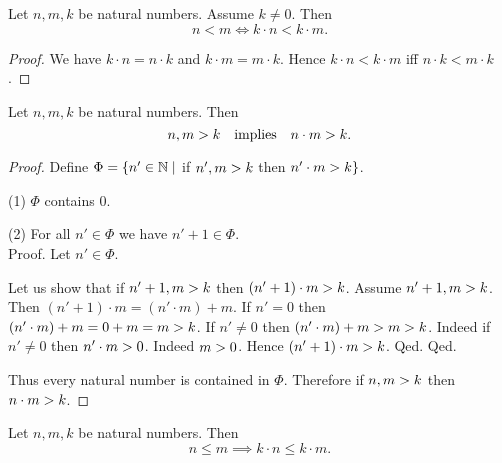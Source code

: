 \documentclass[../arithmetic.tex]{subfiles}
\begin{document}
  \begin{forthel}
    \begin{corollary}
      Let $n, m, k$ be natural numbers.
      Assume $k \neq 0$.
      Then \[ n \less m \iff k \cdot n \less k \cdot m. \]
    \end{corollary}
    \begin{proof}
      We have $k \cdot n = n \cdot k$ and $k \cdot m = m \cdot k$.
      Hence $k \cdot n \less k \cdot m$ iff $n \cdot k \less m \cdot k$.
    \end{proof}
  \end{forthel}

  \begin{forthel}
    \begin{proposition}
      Let $n, m, k$ be natural numbers.
      Then \[ n, m > k \quad \text{implies} \quad n \cdot m > k. \]
    \end{proposition}
    \begin{proof}
      Define $\Phi = \{ n' \in \mathbb{N} \mid$ if $n', m > k$ then $n' \cdot m > k \}$.

      (1) $\Phi$ contains $0$.

      (2) For all $n' \in \Phi$ we have $n' \plus 1 \in \Phi$. \\
      Proof.
        Let $n' \in \Phi$.

        Let us show that if $n' + 1, m > k$ then $(n' + 1) \cdot m > k$.
          Assume $n' + 1, m > k$.
          Then $(n' \plus 1) \cdot m = (n' \cdot m) \plus m$.
          If $n' = 0$ then
          $(n' \cdot m) + m
            = 0 + m
            = m
            > k$.
          If $n' \neq 0$ then
          $(n' \cdot m) + m
            > m
            > k$.
          Indeed if $n' \neq 0$ then $n' \cdot m > 0$.
          Indeed $m > 0$.
          Hence $(n' + 1) \cdot m > k$.
        Qed.
      Qed.

      Thus every natural number is contained in $\Phi$.
      Therefore if $n, m > k$ then $n \cdot m > k$.
    \end{proof}
  \end{forthel}

  \begin{forthel}
    \begin{corollary}
      Let $n, m, k$ be natural numbers.
      Then \[ n \leq m \implies k \cdot n \leq k \cdot m. \]
    \end{corollary}
  \end{forthel}
\end{document}
